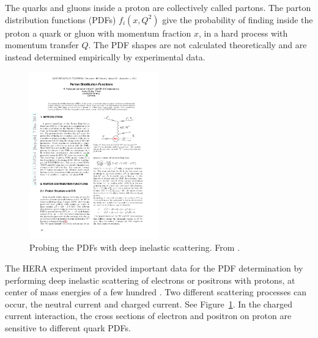 The quarks and gluons inside a proton are collectively called partons.
The parton distribution functions (PDFs) $f_i(x,Q^2)$ give the probability of finding inside the proton a quark or gluon with momentum fraction $x$, in a hard process with momentum transfer $Q$.
The PDF shapes are not calculated theoretically and are instead determined empirically by experimental data.

\begin{figure}[hb]
  \centering
    \includegraphics[width=0.50\textwidth]{figures/dis.pdf}
  \caption{Probing the PDFs with deep inelastic scattering. From \cite{Placakyte:2011az}.} 
  \label{fig:dis}
\end{figure}

The HERA experiment provided important data for the PDF determination by performing
deep inelastic scattering of electrons or positrons with protons, 
at center of mass energies of a few hundred \GeV.
Two different scattering processes can occur, the neutral current and charged current.
See Figure~\ref{fig:dis}.
In the charged current interaction, the cross sections of electron and positron on proton are sensitive to different quark PDFs.
%


